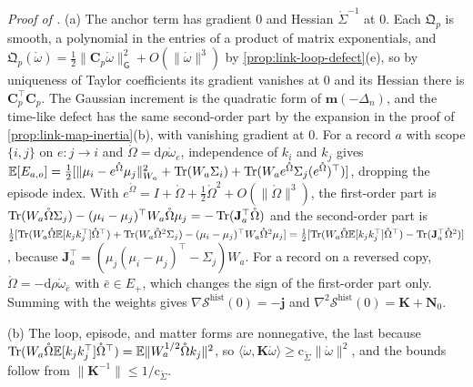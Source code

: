\noindent\emph{Proof of .}
(a) The anchor term has gradient $0$ and Hessian $\mathring\Sigma^{-1}$ at $0$. Each $\mathfrak Q_p$ is
smooth, a polynomial in the entries of a product of matrix exponentials, and
$\mathfrak Q_p(\mathring\omega)=\tfrac12\lVert\mathbf C_p\mathring\omega\rVert_{\mathsf G}^2+O(\lVert\mathring\omega\rVert^3)$
by \cref{prop:link-loop-defect}(e), so by uniqueness of Taylor coefficients its gradient vanishes at
$0$ and its Hessian there is $\mathbf C_p^\top\mathbf C_p$. The Gaussian increment is the quadratic form
of $\mathbf m(-\Delta_n)$, and the time-like defect has the same second-order part by the expansion in
the proof of \cref{prop:link-map-inertia}(b), with vanishing gradient at $0$. For a record $a$ with
scope $\{i,j\}$ on $e:j\to i$ and $\mathring\Omega=\mathrm d\rho\mathring\omega_e$, independence of $k_i$
and $k_j$ gives
$\mathbb E[E_{a,o}]=\tfrac12[\lVert\mu_i-e^{\mathring\Omega}\mu_j\rVert_{W_a}^2+\operatorname{Tr}(W_a\Sigma_i)+\operatorname{Tr}(W_ae^{\mathring\Omega}\Sigma_j(e^{\mathring\Omega})^\top)]$,
dropping the episode index. With $e^{\mathring\Omega}=I+\mathring\Omega+\tfrac12\mathring\Omega^2+O(\lVert\mathring\Omega\rVert^3)$,
the first-order part is
$\operatorname{Tr}(W_a\mathring\Omega\Sigma_j)-(\mu_i-\mu_j)^\top W_a\mathring\Omega\mu_j=-\operatorname{Tr}(\mathbf J_a^\top\mathring\Omega)$ and the
second-order part is
$\tfrac12[\operatorname{Tr}(W_a\mathring\Omega\mathbb E[k_jk_j^\top]\mathring\Omega^\top)+\operatorname{Tr}(W_a\mathring\Omega^2\Sigma_j)-(\mu_i-\mu_j)^\top W_a\mathring\Omega^2\mu_j]=\tfrac12[\operatorname{Tr}(W_a\mathring\Omega\mathbb E[k_jk_j^\top]\mathring\Omega^\top)-\operatorname{Tr}(\mathbf J_a^\top\mathring\Omega^2)]$,
because $\mathbf J_a^\top=(\mu_j(\mu_i-\mu_j)^\top-\Sigma_j)W_a$. For a record on a reversed copy,
$\mathring\Omega=-\mathrm d\rho\mathring\omega_{\bar e}$ with $\bar e\in E_+$, which changes the sign of the
first-order part only. Summing with the weights gives $\nabla\mathscr S^{\mathrm{hist}}(0)=-\mathbf j$ and
$\nabla^2\mathscr S^{\mathrm{hist}}(0)=\mathbf K+\mathbf N_0$.

(b) The loop, episode, and matter forms are nonnegative, the last because
$\operatorname{Tr}(W_a\mathring\Omega\mathbb E[k_jk_j^\top]\mathring\Omega^\top)=\mathbb E\lVert W_a^{1/2}\mathring\Omega k_j\rVert^2$, so
$\langle\mathring\omega,\mathbf K\mathring\omega\rangle\geq\mathrm c_{\mathring\Sigma}\lVert\mathring\omega\rVert^2$,
and the bounds follow from $\lVert\mathbf K^{-1}\rVert\leq1/\mathrm c_{\mathring\Sigma}$.

